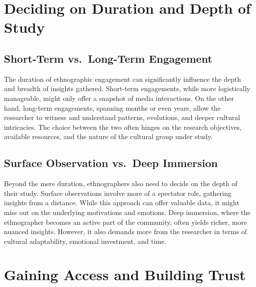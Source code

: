 \documentclass[
  b5paper]{book}
\begin{document}
\hypertarget{deciding-on-duration-and-depth-of-study}{%
\section{Deciding on Duration and Depth of Study}\label{deciding-on-duration-and-depth-of-study}}

\hypertarget{short-term-vs.-long-term-engagement}{%
\subsection*{Short-Term vs.~Long-Term Engagement}\label{short-term-vs.-long-term-engagement}}

The duration of ethnographic engagement can significantly influence the depth and breadth of insights gathered. Short-term engagements, while more logistically manageable, might only offer a snapshot of media interactions. On the other hand, long-term engagements, spanning months or even years, allow the researcher to witness and understand patterns, evolutions, and deeper cultural intricacies. The choice between the two often hinges on the research objectives, available resources, and the nature of the cultural group under study.

\hypertarget{surface-observation-vs.-deep-immersion}{%
\subsection*{Surface Observation vs.~Deep Immersion}\label{surface-observation-vs.-deep-immersion}}

Beyond the mere duration, ethnographers also need to decide on the depth of their study. Surface observations involve more of a spectator role, gathering insights from a distance. While this approach can offer valuable data, it might miss out on the underlying motivations and emotions. Deep immersion, where the ethnographer becomes an active part of the community, often yields richer, more nuanced insights. However, it also demands more from the researcher in terms of cultural adaptability, emotional investment, and time.

\hypertarget{gaining-access-and-building-trust}{%
\section{Gaining Access and Building Trust}\label{gaining-access-and-building-trust}}
\end{document}
